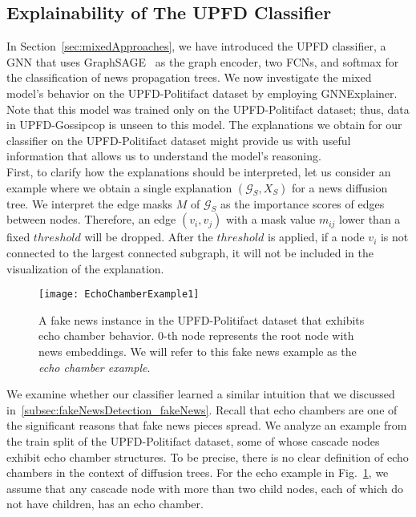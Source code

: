 \subsection{Explainability of The UPFD Classifier}
\label{subsec:ExplaniningGNNs_ExplainingUPFDClassifier}
In Section~\ref{sec:mixedApproaches}, we have introduced the UPFD classifier, a GNN that uses GraphSAGE~\parencite{GraphSAGE_Hamilton} as the graph encoder, two FCNs, and softmax for the classification of news propagation trees. We now investigate the mixed model's behavior on the UPFD-Politifact dataset by employing GNNExplainer. Note that this model was trained only on the UPFD-Politifact dataset; thus, data in UPFD-Gossipcop is unseen to this model. The explanations we obtain for our classifier on the UPFD-Politifact dataset might provide us with useful information that allows us to understand the model's reasoning.\\
First, to clarify how the explanations should be interpreted, let us consider an example where we obtain a single explanation $(\mathcal{G}_S, X_S)$ for a news diffusion tree. We interpret the edge masks $M$ of $\mathcal{G}_S$ as the importance scores of edges between nodes. Therefore, an edge $(v_i, v_j)$ with a mask value $m_{ij}$ lower than a fixed $threshold$ will be dropped. After the $threshold$ is applied, if a node $v_i$ is not connected to the largest connected subgraph, it will not be included in the visualization of the explanation. \\
\begin{figure}
    \centering
    \texttt{[image: EchoChamberExample1]}
    \caption[Echo chamber example from the UPFD-Politifact dataset.]{A fake news instance in the UPFD-Politifact dataset that exhibits echo chamber behavior. $0$-th node represents the root node with news embeddings. We will refer to this fake news example as the \emph{echo chamber example}.}
    \label{fig:echoChamberExample1}
\end{figure}
We examine whether our classifier learned a similar intuition that we discussed in~\ref{subsec:fakeNewsDetection_fakeNews}. Recall that echo chambers are one of the significant reasons that fake news pieces spread. We analyze an example from the train split of the UPFD-Politifact dataset, some of whose cascade nodes exhibit echo chamber structures. To be precise, there is no clear definition of echo chambers in the context of diffusion trees. For the echo example in Fig.~\ref{fig:echoChamberExample1}, we assume that any cascade node with more than two child nodes, each of which do not have children, has an echo chamber.\\
